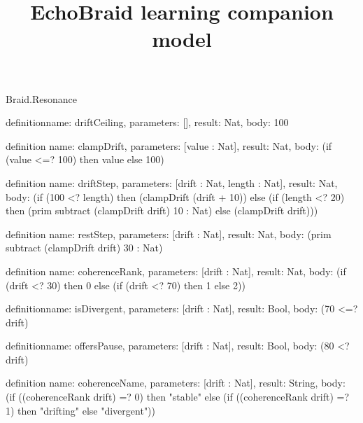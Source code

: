 \begin{lexlean}{Braid.Resonance}
\title{EchoBraid learning companion model}
\begin{semanticmodule}
definition{name: driftCeiling, parameters: [], result: Nat, body: 100}

definition{
  name: clampDrift,
  parameters: [value : Nat],
  result: Nat,
  body: (if (value <=? 100) then value else 100)
}

definition{
  name: driftStep,
  parameters: [drift : Nat, length : Nat],
  result: Nat,
  body: (if (100 <? length) then (clampDrift (drift + 10)) else (if (length <? 20) then (prim subtract (clampDrift drift) 10 : Nat) else (clampDrift drift)))
}

definition{
  name: restStep,
  parameters: [drift : Nat],
  result: Nat,
  body: (prim subtract (clampDrift drift) 30 : Nat)
}

definition{
  name: coherenceRank,
  parameters: [drift : Nat],
  result: Nat,
  body: (if (drift <? 30) then 0 else (if (drift <? 70) then 1 else 2))
}

definition{name: isDivergent, parameters: [drift : Nat], result: Bool, body: (70 <=? drift)}

definition{name: offersPause, parameters: [drift : Nat], result: Bool, body: (80 <? drift)}

definition{
  name: coherenceName,
  parameters: [drift : Nat],
  result: String,
  body: (if ((coherenceRank drift) =? 0) then "stable" else (if ((coherenceRank drift) =? 1) then "drifting" else "divergent"))
}
\end{semanticmodule}
\end{lexlean}
